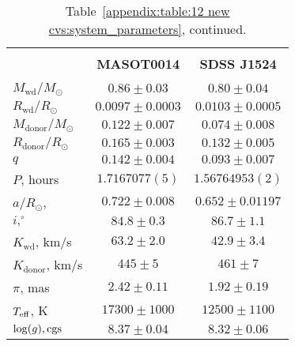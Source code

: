 \begin{landscape}
    \begin{table*}
        \centering
        \caption{Table~\ref{appendix:table:12 new cvs:system_parameters}, continued.}
        \label{appendix:table:12 new cvs:system_parameters cont 2}
        \begin{tabular}{lcc}
            \hline \\
            ~                          & \textbf{MASOT0014}     & \textbf{SDSS J1524} \\
            \hline \hline \\
            $M_\mathrm{wd}/M_\odot$    & $0.86\pm0.03$          & $0.80\pm0.04$ \\
            $R_\mathrm{wd}/R_\odot$    & $0.0097\pm0.0003$      & $0.0103\pm0.0005$ \\
            $M_\mathrm{donor}/M_\odot$ & $0.122\pm0.007$        & $0.074\pm0.008$ \\
            $R_\mathrm{donor}/R_\odot$ & $0.165\pm0.003$        & $0.132\pm0.005$ \\
            $q$                        & $0.142\pm0.004$        & $0.093\pm0.007$ \\
            \hline
            $P$, hours                 & $1.7167077(5)$         & $1.56764953(2)$ \\
            $a/R_\odot$,               & $0.722\pm0.008$        & $0.652\pm0.01197$ \\
            $i, ^\circ$                & $84.8\pm0.3$           & $86.7\pm1.1$ \\
            $K_\mathrm{wd}$, km/s      & $63.2\pm2.0$           & $42.9\pm3.4$ \\
            $K_\mathrm{donor}$, km/s   & $445\pm5$              & $461\pm7$ \\
            \hline
            $\pi$, mas                 & $2.42\pm0.11$          & $1.92\pm0.19$ \\
            $T_{\rm eff}$, K           & $17300\pm1000$         & $12500\pm1100$ \\
            $\log(g), {\rm cgs}$       & $8.37\pm0.04$          & $8.32\pm0.06$ \\
            \hline
            \hline
        \end{tabular}
    \end{table*}



\end{landscape}
